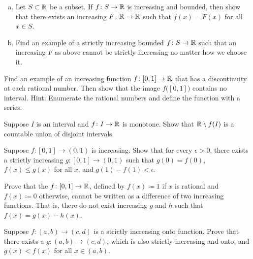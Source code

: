 \begin{exercise}
\leavevmode
\begin{enumerate}[a)]
\item
Let $S \subset {\mathbb{R}}$ be a subset.  If $f \colon S \to {\mathbb{R}}$ is increasing and
bounded,
then show that there exists an increasing $F \colon {\mathbb{R}} \to {\mathbb{R}}$
such that $f(x) = F(x)$ for all $x \in S$.
\item
Find an example of a strictly increasing bounded $f \colon S \to {\mathbb{R}}$ such that
an increasing $F$ as above cannot be strictly increasing no matter how we
choose it.
\end{enumerate}
\end{exercise}

\begin{exercise}[Challenging] \label{exercise:increasingfuncdiscatQ}
Find an example of an increasing function $f \colon [0,1] \to {\mathbb{R}}$
that has a discontinuity at each rational number.  Then show that the image
$f\bigl([0,1]\bigr)$ contains no interval.  Hint: Enumerate
the rational numbers and define
the function with a series.
\end{exercise}

\begin{exercise}
Suppose $I$ is an interval and $f \colon I \to {\mathbb{R}}$ is monotone.
Show that ${\mathbb{R}} \setminus f(I)$ is a countable union of disjoint intervals.
\end{exercise}

\begin{exercise}
Suppose $f \colon [0,1] \to (0,1)$ is increasing.  Show that for every
$\epsilon > 0$, there exists
a strictly increasing $g \colon [0,1] \to (0,1)$ such that
$g(0) = f(0)$, $f(x) \leq g(x)$ for all $x$, and $g(1)-f(1) < \epsilon$.
\end{exercise}

\begin{exercise}
Prove that the 
$f \colon [0,1] \to{\mathbb{R}}$, defined by $f(x) \coloneqq 1$
if $x$ is rational and $f(x) \coloneqq 0$ otherwise, cannot be written as a
difference of two increasing functions.  That is, there do not exist
increasing $g$ and $h$ such that $f(x) = g(x) - h(x)$.
\end{exercise}

\begin{exercise}
Suppose $f \colon (a,b) \to (c,d)$ is a strictly increasing
onto function.  Prove that there exists a $g \colon (a,b) \to (c,d)$,
which is also strictly increasing and onto, and $g(x) < f(x)$ for all $x \in
(a,b)$.
\end{exercise}


